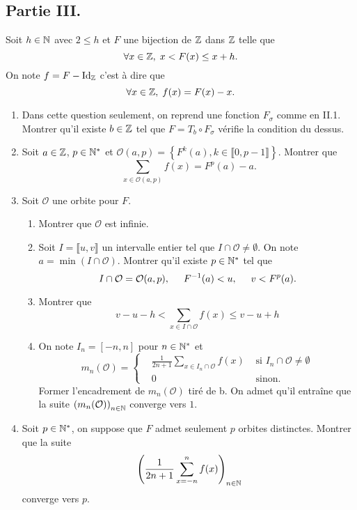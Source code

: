 \subsection*{Partie III.}
Soit $h\in \mathbb{N}$ avec $2 \leq h$ et $F$ une bijection de $\mathbb{Z}$ dans $\mathbb{Z}$ telle que
\begin{displaymath}
 \forall x \in \mathbb{Z}, \; x < F(x) \leq x + h.
\end{displaymath}
On note $f = F -\operatorname{Id}_{\mathbb{Z}}$ c'est à dire que 
\begin{displaymath}
 \forall x \in \mathbb{Z}, \; f(x) = F(x) - x.
\end{displaymath}
\begin{enumerate}
 \item Dans cette question seulement, on reprend une fonction $F_\sigma$ comme en II.1. Montrer qu'il existe $b\in \mathbb{Z}$ tel que $F = T_b \circ F_\sigma$ vérifie la condition du dessus.

 \item Soit $a\in \mathbb{Z}$, $p\in \mathbb{N}^*$ et $\mathcal{O}(a,p)=\left\lbrace F^k(a), k\in \llbracket 0, p-1 \rrbracket \right\rbrace$. Montrer que 
\begin{displaymath}
 \sum_{x \in \mathcal{O}(a,p)}f(x) = F^p(a) - a.
\end{displaymath}

\item Soit $\mathcal{O}$ une orbite pour $F$. 
\begin{enumerate}
 \item Montrer que $\mathcal{O}$ est infinie.
 \item Soit $I = \llbracket u,v \rrbracket$ un intervalle entier tel que $I \cap \mathcal{O}\neq \emptyset$. On note $a = \min( I \cap \mathcal{O})$. Montrer qu'il existe $p\in \mathbb{N}^*$ tel que 
\begin{displaymath}
 I \cap \mathcal{O} = \mathcal{O}(a,p), \hspace{0.5cm} F^{-1}(a) < u, \hspace{0.5cm} v < F^p(a).
\end{displaymath}
 \item Montrer que 
\begin{displaymath}
 v - u - h < \sum_{x \in I \cap \mathcal{O}} f(x) \leq v -u + h
\end{displaymath}
\item On note $I_n = \left[ -n , n \right] $ pour $n\in \mathbb{N}^*$ et
\begin{displaymath}
 m_n(\mathcal{O}) = 
\left\lbrace  
\begin{aligned}
 &\frac{1}{2n+1} \sum_{x \in I_n \cap \mathcal{O}} f(x) &\text{ si } I_n \cap \mathcal{O} \neq \emptyset \\
 & 0 &\text{ sinon.}
\end{aligned}
\right. 
\end{displaymath}
Former l'encadrement de $m_n(\mathcal{O})$ tiré de b. On admet qu'il entraîne que la suite $\left( m_n(\mathcal{O}) \right)_{n \in \mathbb{N}}$ converge vers $1$.
\end{enumerate}

\item Soit $p\in \mathbb{N}^*$, on suppose que $F$ admet seulement $p$ orbites distinctes. Montrer que la suite 
\begin{displaymath}
 \left( \frac{1}{2n+1}\sum_{x = -n}^{n}f(x) \right)_{n \in \mathbb{N}}
\end{displaymath}
converge vers $p$.
\end{enumerate}
